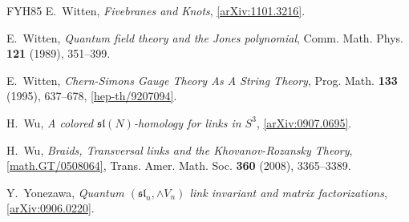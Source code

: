 \documentclass{compositio}
\theoremstyle{definition}
\numberwithin{equation}{section}
\begin{document}
\begin{thebibliography}{FYH{\etalchar{+}}85}
E.~Witten, \emph{Fivebranes and {K}nots},
  \href{http://arxiv.org/abs/1101.3216}{[arXiv:1101.3216]}.

E.~Witten, \emph{Quantum field theory and the {J}ones polynomial}, Comm. Math.
  Phys. \textbf{121} (1989), 351--399.

E.~Witten, \emph{Chern-{S}imons {G}auge {T}heory {A}s {A} {S}tring {T}heory},
  Prog. Math. \textbf{133} (1995), 637--678,
  \href{http://arxiv.org/abs/hep-th/9207094}{[hep-th/9207094]}.

H.~Wu, \emph{A colored {$\mathfrak{sl}(N)$}-homology for links in {$S^3$}},
  \href{http://arxiv.org/abs/0907.0695}{[arXiv:0907.0695]}.

H.~Wu, \emph{Braids, {T}ransversal links and the {K}hovanov-{R}ozansky {T}heory},
  \href{http://arxiv.org/abs/math/0508064}{[math.GT/0508064]}, Trans. Amer. Math. Soc. \textbf{360}
  (2008), 3365--3389.

Y.~Yonezawa, \emph{Quantum {$(\mathfrak{sl}_n, \wedge V_n)$} link invariant and
  matrix factorizations},
  \href{http://arxiv.org/abs/0906.0220}{[arXiv:0906.0220]}.

\end{thebibliography}
\end{document}
